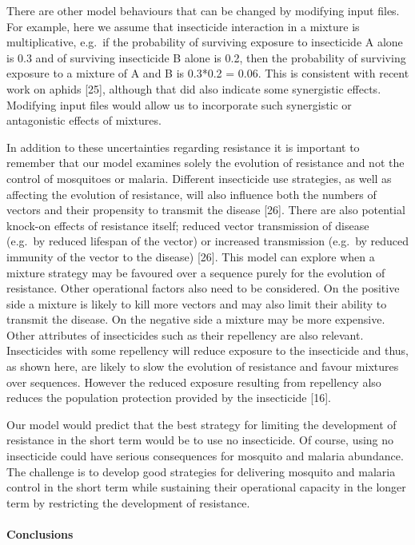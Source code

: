 \documentclass[11pt,]{article}
\let\oldparagraph\paragraph
\renewcommand{\paragraph}[1]{\oldparagraph{#1}\mbox{}}
\begin{document}
There are other model behaviours that can be changed by modifying input
files. For example, here we assume that insecticide interaction in a
mixture is multiplicative, e.g.~if the probability of surviving exposure
to insecticide A alone is 0.3 and of surviving insecticide B alone is
0.2, then the probability of surviving exposure to a mixture of A and B
is 0.3*0.2 = 0.06. This is consistent with recent work on aphids
{[}25{]}, although that did also indicate some synergistic effects.
Modifying input files would allow us to incorporate such synergistic or
antagonistic effects of mixtures.

In addition to these uncertainties regarding resistance it is important
to remember that our model examines solely the evolution of resistance
and not the control of mosquitoes or malaria. Different insecticide use
strategies, as well as affecting the evolution of resistance, will also
influence both the numbers of vectors and their propensity to transmit
the disease {[}26{]}. There are also potential knock-on effects of
resistance itself; reduced vector transmission of disease (e.g.~by
reduced lifespan of the vector) or increased transmission (e.g.~by
reduced immunity of the vector to the disease) {[}26{]}. This model can
explore when a mixture strategy may be favoured over a sequence purely
for the evolution of resistance. Other operational factors also need to
be considered. On the positive side a mixture is likely to kill more
vectors and may also limit their ability to transmit the disease. On the
negative side a mixture may be more expensive. Other attributes of
insecticides such as their repellency are also relevant. Insecticides
with some repellency will reduce exposure to the insecticide and thus,
as shown here, are likely to slow the evolution of resistance and favour
mixtures over sequences. However the reduced exposure resulting from
repellency also reduces the population protection provided by the
insecticide {[}16{]}.

Our model would predict that the best strategy for limiting the
development of resistance in the short term would be to use no
insecticide. Of course, using no insecticide could have serious
consequences for mosquito and malaria abundance. The challenge is to
develop good strategies for delivering mosquito and malaria control in
the short term while sustaining their operational capacity in the longer
term by restricting the development of resistance.

\paragraph{Conclusions}\label{conclusions-1}
\end{document}
